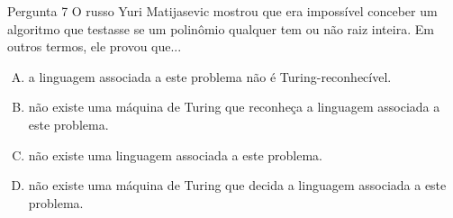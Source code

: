 \documentclass[xcolor=dvipsnames,table]{beamer}
\begin{document}
	\begin{frame}
		\begin{block}{Pergunta 7}
			O russo Yuri Matijasevic mostrou que era impossível conceber um algoritmo que testasse se um polinômio qualquer tem ou não raiz inteira. Em outros termos, ele provou que...
		\end{block}
		\begin{enumerate}[(A)]
			\item a linguagem associada a este problema não é Turing-reconhecível. 
			\item não existe uma máquina de Turing que reconheça a linguagem associada a este problema.
			\item não existe uma linguagem associada a este problema.
			\item não existe uma máquina de Turing que decida a linguagem associada a este problema.
		\end{enumerate}
	\end{frame}
\end{document}
